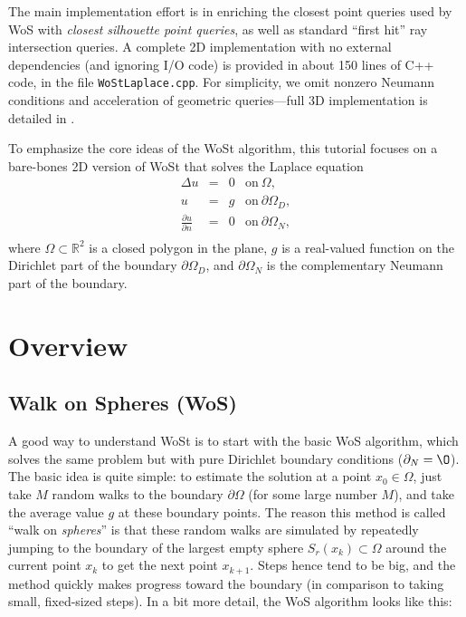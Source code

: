 \documentclass{article}
\newcommand{\code}[1]{\texttt{\small{#1}}}
\renewcommand{\vec}[1]{#1}
\begin{document}
The main implementation effort is in enriching the closest point queries used by WoS with \emph{closest silhouette point queries}, as well as standard ``first hit'' ray intersection queries.  A complete 2D implementation with no external dependencies (and ignoring I/O code) is provided in about 150 lines of C++ code, in the file \code{WoStLaplace.cpp}.  For simplicity, we omit nonzero Neumann conditions and acceleration of geometric queries---full 3D implementation is detailed in \citet{Sawhney:2023:WoSt}.

To emphasize the core ideas of the WoSt algorithm, this tutorial focuses on a bare-bones 2D version of WoSt that solves the Laplace equation
\[
   \begin{array}{rcll}
      \Delta u &=& 0 & \text{on}\ \Omega, \\
             u &=& g & \text{on}\ \partial\Omega_D, \\
             \tfrac{\partial u}{\partial n} &=& 0 & \text{on}\ \partial\Omega_N, \\
   \end{array}
\]
where \(\Omega \subset \mathbb{R}^2\) is a closed polygon in the plane, \(g\) is a real-valued function on the Dirichlet part of the boundary \(\partial\Omega_D\), and \(\partial\Omega_N\) is the complementary Neumann part of the boundary.  

\newpage

\section{Overview}
\label{sec:Overview}

\subsection{Walk on Spheres (WoS)}
\label{sec:WalkOnSpheresOverview}


A good way to understand WoSt is to start with the basic WoS algorithm, which solves the same problem but with pure Dirichlet boundary conditions (\(\partial_N = \O\)).  The basic idea is quite simple: to estimate the solution at a point \(\vec{x}_0 \in \Omega\), just take \(M\) random walks to the boundary \(\partial\Omega\) (for some large number \(M\)), and take the average value \(g\) at these boundary points.  The reason this method is called ``walk on \emph{spheres}'' is that these random walks are simulated by repeatedly jumping to the boundary of the largest empty sphere \(S_r(\vec{x}_k) \subset \Omega\) around the current point \(\vec{x}_k\) to get the next point \(\vec{x}_{k+1}\).  Steps hence tend to be big, and the method quickly makes progress toward the boundary (in comparison to taking small, fixed-sized steps).  In a bit more detail, the WoS algorithm looks like this:
\end{document}
